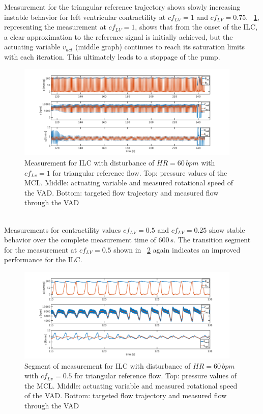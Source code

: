 Measurement for the triangular reference trajectory shows slowly increasing instable behavior for left ventricular contractility at $cf_{LV}=1$ and $cf_{LV}=0.75$. \figurename~\ref{fig:pi_to_ilc_dist_triang_cf1}, representing the measurement at $cf_{LV}=1$, shows that from the onset of the ILC, a clear approximation to the reference signal is initially achieved, but the actuating variable $v_{act}$ (middle graph) continues to reach its saturation limits with each iteration. This ultimately leads to a stoppage of the pump.
\begin{figure}[ht!]
  \centering
  \includegraphics[width=0.95\textwidth]{images/chapt_5/ILC/pi_to_ilc_dist_triang_cf1.pdf}
  \caption[Measurement for ILC with disturbance of $HR=60\,bpm$ with $cf_{Lv}=1$ for triangular reference flow]{Measurement for ILC with disturbance of $HR=60\,bpm$ with $cf_{Lv}=1$ for triangular reference flow. Top:  pressure values of the MCL. Middle: actuating variable and measured rotational speed of the VAD. Bottom: targeted flow trajectory and measured flow through the VAD}
  \label{fig:pi_to_ilc_dist_triang_cf1}
\end{figure}
\\Measurements for contractility values $cf_{LV}=0.5$ and $cf_{LV}=0.25$ show stable behavior over the complete measurement time of $600\,s$. The transition segment for the measurement at $cf_{LV}=0.5$ shown in \figurename~\ref{fig:pi_to_ilc_dist_triang_cf50} again indicates an improved performance for the ILC.
\begin{figure}[ht!]
  \centering
  \includegraphics[width=0.95\textwidth]{images/chapt_5/ILC/pi_to_ilc_dist_triang_cf50.pdf}
  \caption[]{Segment of measurement for ILC with disturbance of $HR=60\,bpm$ with $cf_{Lv}=0.5$ for triangular reference flow. Top:  pressure values of the MCL. Middle: actuating variable and measured rotational speed of the VAD. Bottom: targeted flow trajectory and measured flow through the VAD}
  \label{fig:pi_to_ilc_dist_triang_cf50}
\end{figure}
